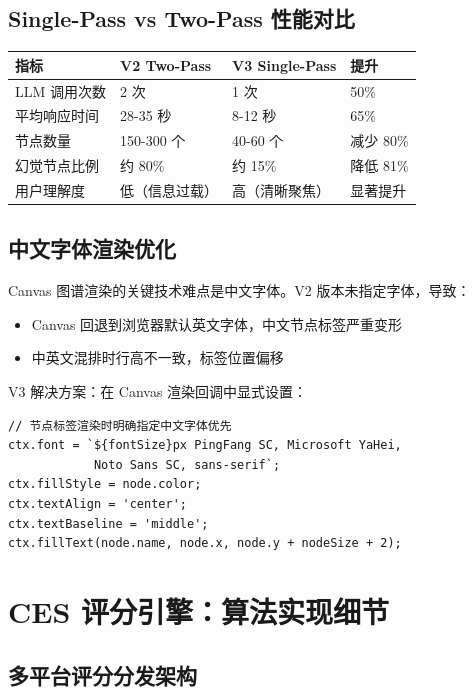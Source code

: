 \documentclass[12pt,a4paper]{ctexart}
\begin{document}
\subsection{Single-Pass vs Two-Pass 性能对比}

\begin{center}
\begin{tabular}{p{3.5cm} p{4cm} p{4cm} p{2cm}}
\toprule
\textbf{指标} & \textbf{V2 Two-Pass} & \textbf{V3 Single-Pass} & \textbf{提升} \\
\midrule
LLM 调用次数 & 2 次 & 1 次 & 50\% \\[2pt]
平均响应时间 & 28-35 秒 & 8-12 秒 & 65\% \\[2pt]
节点数量 & 150-300 个 & 40-60 个 & 减少 80\% \\[2pt]
幻觉节点比例 & 约 80\% & 约 15\% & 降低 81\% \\[2pt]
用户理解度 & 低（信息过载） & 高（清晰聚焦） & 显著提升 \\
\bottomrule
\end{tabular}
\end{center}

\subsection{中文字体渲染优化}

Canvas 图谱渲染的关键技术难点是中文字体。V2 版本未指定字体，导致：
\begin{itemize}
  \item Canvas 回退到浏览器默认英文字体，中文节点标签严重变形
  \item 中英文混排时行高不一致，标签位置偏移
\end{itemize}

V3 解决方案：在 Canvas 渲染回调中显式设置：
\begin{lstlisting}[style=pycode,caption={KnowledgeGraph3D.tsx — 中文字体修复}]
// 节点标签渲染时明确指定中文字体优先
ctx.font = `${fontSize}px PingFang SC, Microsoft YaHei,
            Noto Sans SC, sans-serif`;
ctx.fillStyle = node.color;
ctx.textAlign = 'center';
ctx.textBaseline = 'middle';
ctx.fillText(node.name, node.x, node.y + nodeSize + 2);
\end{lstlisting}


\section{CES 评分引擎：算法实现细节}

\subsection{多平台评分分发架构}
\end{document}
